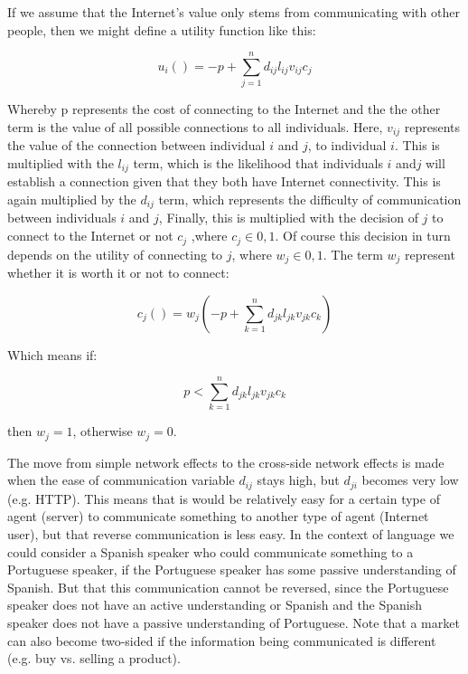 \documentclass[a4paper,british]{article}\usepackage[]{graphicx}\usepackage[]{color}
\begin{document}
If we assume that the Internet's value only stems from communicating
with other people, then we might define a utility function like this: 

\begin{equation}
u_{i}()=-p+\sum_{j=1}^{n}d_{ij}l_{ij}v_{ij}c_{j}
\end{equation}

Whereby p represents the cost of connecting to the Internet and the
the other term is the value of all possible connections to all individuals.
Here, $v_{ij}$ represents the value of the connection between individual
$i$ and $j$, to individual $i$. This is multiplied with the $l_{ij}$
term, which is the likelihood that individuals $i$ and$j$ will establish
a connection given that they both have Internet connectivity. This
is again multiplied by the $d_{ij}$ term, which represents the difficulty
of communication between individuals $i$ and $j$, Finally, this
is multiplied with the decision of $j$ to connect to the Internet
or not $c_{j}$ ,where $c_{j}\in{0,1}$. Of course this decision in
turn depends on the utility of connecting to $j$, where $w_{j}\in{0,1}$.
The term $w_{j}$ represent whether it is worth it or not to connect:

\begin{equation}
c_{j}()=w_{j}(-p+\sum_{k=1}^{n}d_{jk}l_{jk}v_{jk}c_{k})
\end{equation}

Which means if:

\begin{equation}
p<\sum_{k=1}^{n}d_{jk}l_{jk}v_{jk}c_{k}
\end{equation}

then $w_{j}=1$, otherwise $w_{j}=0$.

The move from simple network effects to the cross-side network effects
is made when the ease of communication variable $d_{ij}$ stays high,
but $d_{ji}$ becomes very low (e.g. HTTP). This means that is would
be relatively easy for a certain type of agent (server) to communicate
something to another type of agent (Internet user), but that reverse
communication is less easy. In the context of language we could consider
a Spanish speaker who could communicate something to a Portuguese
speaker, if the Portuguese speaker has some passive understanding
of Spanish. But that this communication cannot be reversed, since
the Portuguese speaker does not have an active understanding or Spanish
and the Spanish speaker does not have a passive understanding of Portuguese.
Note that a market can also become two-sided if the information being
communicated is different (e.g. buy vs. selling a product).
\end{document}
